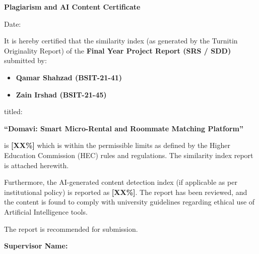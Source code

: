 
\newpage
\thispagestyle{empty}

\begin{center}
\textbf{\LARGE Plagiarism and AI Content Certificate}
\end{center}

\vspace{1cm}

\noindent
Date: \underline{\hspace{4cm}}

\vspace{1cm}

\noindent
It is hereby certified that the similarity index (as generated by the Turnitin
Originality Report) of the \textbf{Final Year Project Report (SRS / SDD)}
submitted by:

\begin{itemize}
    \item \textbf{Qamar Shahzad (BSIT-21-41)}
    \item \textbf{Zain Irshad (BSIT-21-45)}
\end{itemize}

\noindent
titled:

\begin{center}
\textbf{``Domavi: Smart Micro-Rental and Roommate Matching Platform''}
\end{center}

\noindent
is \textbf{[XX\%]} which is within the permissible limits as defined by the 
Higher Education Commission (HEC) rules and regulations. The similarity index 
report is attached herewith.

\vspace{0.5cm}

\noindent
Furthermore, the AI-generated content detection index (if applicable as per 
institutional policy) is reported as \textbf{[XX\%]}. The report has been reviewed, 
and the content is found to comply with university guidelines regarding 
ethical use of Artificial Intelligence tools.

\vspace{0.5cm}

\noindent
The report is recommended for submission.

\vspace{2cm}

\noindent
\textbf{Supervisor Name:} \underline{\hspace{6cm}}  

